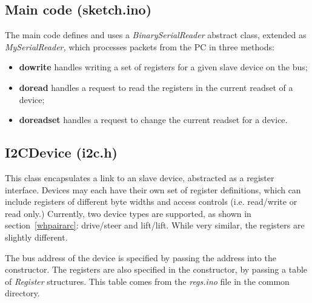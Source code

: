 

\clearpage
\subsection{Main code (sketch.ino)}
The main code defines and uses a \emph{BinarySerialReader} abstract class,
extended as \emph{MySerialReader,} which processes packets
from the PC in three methods:
\begin{itemize}
\item \textbf{dowrite} handles writing a set of registers for a given slave device
on the \isqc{} bus;
\item \textbf{doread} handles a request to read the registers in the current readset of a device;
\item \textbf{doreadset} handles a request to change the current readset for a device.
\end{itemize}

\subsection{I2CDevice (i2c.h)}
This class encapsulates a link to an \isqc{} slave device, abstracted
as a register interface. Devices may each have their own set of register
definitions, which can include registers of different byte widths and
access controls (i.e. read/write or read only.) Currently, two device types
are supported, as shown in section~\ref{whpairarc}: drive/steer and lift/lift.
While very similar, the registers are slightly different.

The bus address of the device is specified by passing the address into the
constructor.
The registers are also specified in the constructor, by passing a table of
\emph{Register} structures. This table comes from the \emph{regs.ino} file in the common
directory.

